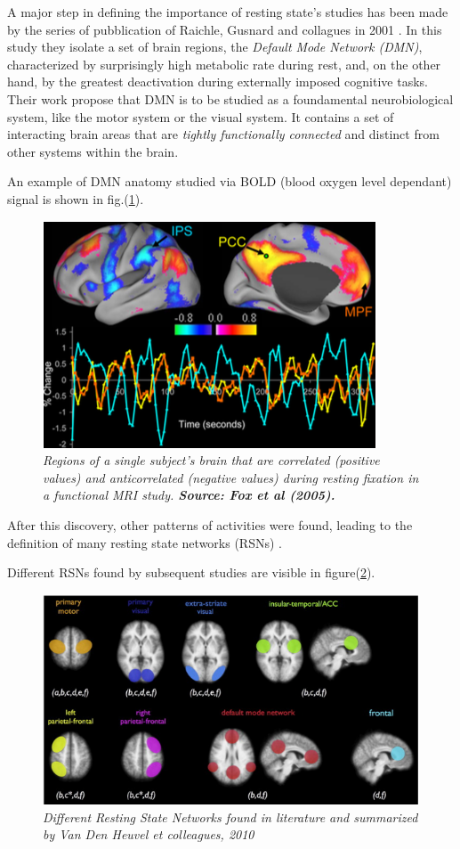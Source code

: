 \documentclass[12pt,openright,twoside,a4paper]{book}
\begin{document}
A major step in defining the importance of resting state's studies has been made by the series of pubblication of Raichle, Gusnard and collagues in 2001 \cite{default-mode}.
In this study they isolate a set of brain regions, the \textit{Default Mode Network (DMN)}, characterized by surprisingly high metabolic rate during rest, and, on the other hand, by the greatest deactivation during externally imposed cognitive tasks. 
Their work propose that DMN is to be studied as a foundamental neurobiological system, like the motor system or the visual system.
It contains a set of interacting brain areas that are \textit{tightly functionally connected} and distinct from other systems within the brain.

An example of DMN anatomy studied via BOLD ({blood oxygen level dependant}) signal is shown in fig.(\ref{default-mode}).

\begin{figure}[!h]
\centering
\includegraphics[scale=0.6]{default-mode}
\caption{\textit{Regions of a single subject's brain that are correlated (positive values) and anticorrelated (negative values) during resting  fixation in a functional MRI study. \textbf{Source: Fox et al (2005). \cite{DMN}}}}
\label{default-mode}
\end{figure}

After this discovery, other patterns of activities were found, leading to the definition of many resting state networks (RSNs) \cite{RNS}.

Different RSNs found by subsequent studies are visible in figure(\ref{resting-nws}).

\begin{figure}[!h]
\centering
\includegraphics[scale=0.6]{resting-nws}
\caption{\textit{Different Resting State Networks found in literature and summarized by Van Den Heuvel et colleagues, 2010 \cite{RNS}}}
\label{resting-nws}
\end{figure}
\end{document}
